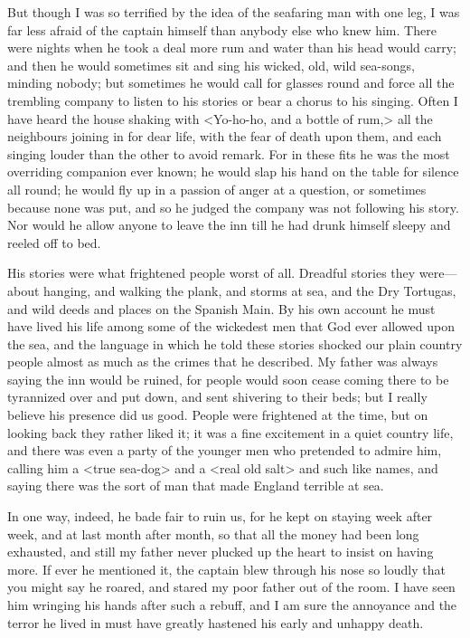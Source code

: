 But though I was so terrified by the idea of the seafaring man with one leg, I was far less afraid of the captain himself than anybody else who knew him. There were nights when he took a deal more rum and water than his head would carry; and then he would sometimes sit and sing his wicked, old, wild sea-songs, minding nobody; but sometimes he would call for glasses round and force all the trembling company to listen to his stories or bear a chorus to his singing. Often I have heard the house shaking with <Yo-ho-ho, and a bottle of rum,> all the neighbours joining in for dear life, with the fear of death upon them, and each singing louder than the other to avoid remark. For in these fits he was the most overriding companion ever known; he would slap his hand on the table for silence all round; he would fly up in a passion of anger at a question, or sometimes because none was put, and so he judged the company was not following his story. Nor would he allow anyone to leave the inn till he had drunk himself sleepy and reeled off to bed.

His stories were what frightened people worst of all. Dreadful stories they were—about hanging, and walking the plank, and storms at sea, and the Dry Tortugas, and wild deeds and places on the Spanish Main. By his own account he must have lived his life among some of the wickedest men that God ever allowed upon the sea, and the language in which he told these stories shocked our plain country people almost as much as the crimes that he described. My father was always saying the inn would be ruined, for people would soon cease coming there to be tyrannized over and put down, and sent shivering to their beds; but I really believe his presence did us good. People were frightened at the time, but on looking back they rather liked it; it was a fine excitement in a quiet country life, and there was even a party of the younger men who pretended to admire him, calling him a <true sea-dog> and a <real old salt> and such like names, and saying there was the sort of man that made England terrible at sea.

In one way, indeed, he bade fair to ruin us, for he kept on staying week after week, and at last month after month, so that all the money had been long exhausted, and still my father never plucked up the heart to insist on having more. If ever he mentioned it, the captain blew through his nose so loudly that you might say he roared, and stared my poor father out of the room. I have seen him wringing his hands after such a rebuff, and I am sure the annoyance and the terror he lived in must have greatly hastened his early and unhappy death.

